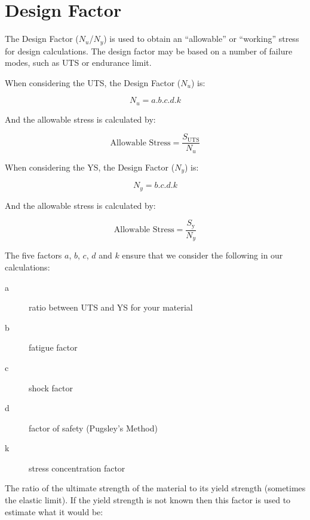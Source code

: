 \section{Design Factor}\label{sec:DF}

The Design Factor (\(N_u\)/\(N_y\)) is used to obtain an ``allowable'' or ``working'' stress for design calculations. The design factor may be based on a number of failure modes, such as \ac{UTS} or endurance limit.

When considering the \ac{UTS}, the Design Factor (\(N_u\)) is:

\begin{equation}
    N_u = a.b.c.d.k 
\end{equation}

And the allowable stress is calculated by:

\begin{equation}
    \text{Allowable Stress} = \frac{S_\text{UTS}}{N_u}
\end{equation}

When considering the \acf{YS}, the Design Factor (\(N_y\)) is:

\begin{equation}
    N_y = b.c.d.k
\end{equation}

And the allowable stress is calculated by:

\begin{equation}
    \text{Allowable Stress} = \frac{S_\text{y}}{N_y} 
\end{equation}

The five factors \(a\), \(b\), \(c\), \(d\) and \(k\) ensure that we consider the following in our calculations: 

\begin{description}
    \item[a] ratio between \ac{UTS} and \ac{YS} for your material
    \item[b] fatigue factor
    \item[c] shock factor
    \item[d] factor of safety (Pugsley's Method)
    \item[k] stress concentration factor
\end{description}

The ratio of the ultimate strength of the material to its yield strength (sometimes the elastic limit). If the yield strength is not known then this factor is used to estimate what it would be:

